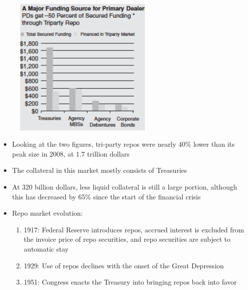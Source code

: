 \documentclass[11pt]{beamer}
\begin{document}
\begin{frame}
\begin{figure}
\includegraphics[width=0.6\textwidth]{11_3.png}
\end{figure}
\end{frame}

\begin{frame}
\begin{itemize}
\item Looking at the two figures, tri-party repos were nearly 40\% lower than its peak size in 2008, at $1.7$ trillion dollars
\item The collateral in this market mostly consists of Treasuries
\item At $320$ billion dollars, less liquid collateral is still
a large portion, although this has decreased by 65\% since the start of the financial crisis
\item Repo market evolution:
\begin{enumerate}
\item 1917: Federal Reserve introduces repos, accrued interest is excluded from the invoice price of repo securities, and repo securities are subject to automatic stay
\item 1929: Use of repos declines with the onset of the Great Depression
\item 1951: Congress enacts the Treasury into bringing repos back into favor
\end{enumerate}
\end{itemize}
\end{frame}
\end{document}
